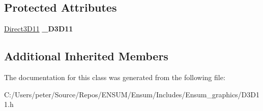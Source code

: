 \subsection*{Protected Attributes}
\begin{DoxyCompactItemize}
\item 
\hyperlink{class_ensum_1_1_graphics_1_1_direct3_d11}{Direct3\+D11} {\bfseries \+\_\+\+D3\+D11}\hypertarget{class_ensum_1_1_graphics_1_1_d3_d11_a4b546673d48ed239e6704743e901be3e}{}\label{class_ensum_1_1_graphics_1_1_d3_d11_a4b546673d48ed239e6704743e901be3e}

\end{DoxyCompactItemize}
\subsection*{Additional Inherited Members}


The documentation for this class was generated from the following file\+:\begin{DoxyCompactItemize}
\item 
C\+:/\+Users/peter/\+Source/\+Repos/\+E\+N\+S\+U\+M/\+Ensum/\+Includes/\+Ensum\+\_\+graphics/D3\+D11.\+h\end{DoxyCompactItemize}
